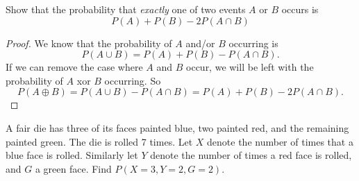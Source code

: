 \documentclass{exam}
\begin{document}
\begin{questions}

\newpage
\question
Show that the probability that \textit{exactly} one of two events $A$ or $B$ occurs is
$$P(A) + P(B) - 2P(A \cap B)$$
\begin{proof}
We know that the probability of $A$ and/or $B$ occurring is
$$P(A \cup B) = P(A) + P(B) - P(A \cap B).$$
If we can remove the case where $A$ and $B$ occur, we will be left with the probability of $A$ xor $B$ occurring. So
$$P(A \oplus B) = P(A \cup B) - P(A \cap B) = P(A) + P(B) - 2P(A \cap B).$$
\end{proof}

\newpage
\question
A fair die has three of its faces painted blue, two painted red, and the remaining painted green. The die is rolled 7 times. Let $X$ denote the number of times that a blue face is rolled. Similarly let $Y$ denote the number of times a  red face is rolled, and $G$ a green face. Find $P(X = 3, Y = 2, G = 2)$.


\end{questions}
\end{document}
